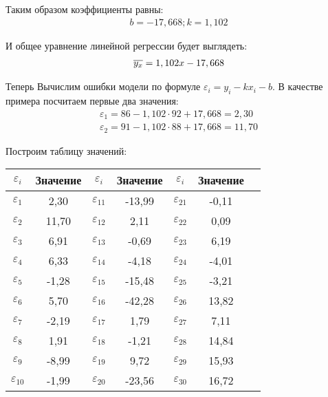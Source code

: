 \documentclass[utf8, a4paper, 14pt, russian, oneside]{book}
\begin{document}
Таким образом коэффициенты равны:
\begin{align*}
    b = -17,668; k =  1,102   
\end{align*}

И общее уравнение линейной регрессии будет выглядеть:
\begin{align*}
    \overline{ y_x } = 1,102x - 17,668
\end{align*}

Теперь Вычислим ошибки модели по формуле $\varepsilon_i = y_i - kx_i - b$. В качестве примера посчитаем первые два значения:
\begin{gather*}
    \varepsilon_1 = 86 - 1,102 \cdot 92 + 17,668 = 2,30 \\
    \varepsilon_2 = 91 - 1,102 \cdot 88 + 17,668 = 11,70
\end{gather*}

Построим таблицу значений:
\begin{table}[h!]
    \centering
    \begin{tabular}{|c|c|c|c|c|c|c|}
        \hline
        $\varepsilon_i$ & Значение & $\varepsilon_i$ & Значение & $\varepsilon_i$ & Значение  \\ \hline
        $\varepsilon_1$ & 2,30  & $\varepsilon_{11}$ & -13,99    &$\varepsilon_{21}$ & -0,11  \\ \hline
        $\varepsilon_2$ & 11,70  & $\varepsilon_{12}$ & 2,11     & $\varepsilon_{22}$ & 0,09  \\ \hline
        $\varepsilon_3$ & 6,91  & $\varepsilon_{13}$ & -0,69     & $\varepsilon_{23}$ & 6,19  \\ \hline
        $\varepsilon_4$ & 6,33  & $\varepsilon_{14}$ & -4,18     &$\varepsilon_{24}$ & -4,01  \\ \hline
        $\varepsilon_5$ & -1,28  & $\varepsilon_{15}$ & -15,48   &$\varepsilon_{25}$ & -3,21  \\ \hline
        $\varepsilon_6$ & 5,70  & $\varepsilon_{16}$ & -42,28    &$\varepsilon_{26}$ & 13,82  \\ \hline
        $\varepsilon_7$ & -2,19  & $\varepsilon_{17}$ & 1,79     & $\varepsilon_{27}$ & 7,11  \\ \hline
        $\varepsilon_8$ & 1,91  & $\varepsilon_{18}$ & -1,21     &$\varepsilon_{28}$ & 14,84  \\ \hline
        $\varepsilon_9$ & -8,99 &  $\varepsilon_{19}$ & 9,72     &$\varepsilon_{29}$ & 15,93  \\ \hline
        $\varepsilon_{10}$ & -1,99 & $\varepsilon_{20}$ & -23,56 &$\varepsilon_{30}$ & 16,72  \\ \hline
    \end{tabular} 
\end{table}
\end{document}
